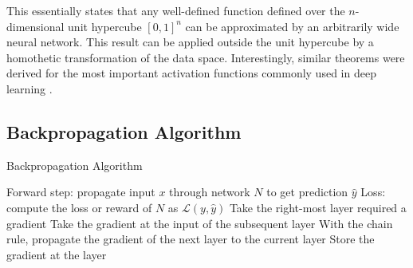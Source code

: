 This essentially states that any well-defined function defined over the $n$-dimensional unit hypercube $[0, 1]^n$ can be approximated by an arbitrarily wide neural network. This result can be applied outside the unit hypercube by a homothetic transformation of the data space. Interestingly, similar theorems were derived for the most important activation functions commonly used in deep learning \cite{universApproximator-Relu}.

\subsection{Backpropagation Algorithm}\label{app:back_pro}
\begin{algorithm}
    \caption{Backpropagation Algorithm}
    \begin{algorithmic}
        \State Forward step: propagate input $x$ through network $N$ to get prediction $\hat{y}$
        \State Loss: compute the loss or reward of $N$ as $\mathcal{L}(y, \hat{y})$
            \State Take the right-most layer required a gradient
            \State Take the gradient at the input of the subsequent layer
            \State With the chain rule, propagate the gradient of the next layer to the current layer
            \State Store the gradient at the layer
        \EndWhile
    \EndFunction
    \end{algorithmic}
    \label{ag:backpropagation}
\end{algorithm}